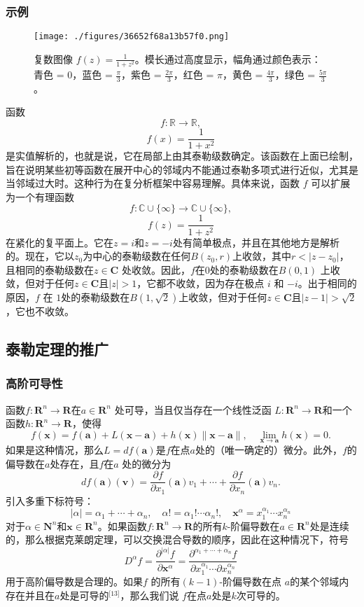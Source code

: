 \subsubsection{示例}
\begin{figure}[ht]
\centering
\texttt{[image: ./figures/36652f68a13b57f0.png]}
\caption{复数图像 \( f(z) = \frac{1}{1 + z^2} \)。模长通过高度显示，幅角通过颜色表示：青色 = 0，蓝色 = \( \frac{\pi}{3} \)，紫色 = \( \frac{2\pi}{3} \)，红色 = \( \pi \)，黄色 = \( \frac{4\pi}{3} \)，绿色 = \( \frac{5\pi}{3} \)。} \label{fig_TLGS_6}
\end{figure}
函数
\[
f : \mathbb{R} \to \mathbb{R},~
\]
\[
f(x) = \frac{1}{1 + x^2}~
\]
是实值解析的，也就是说，它在局部上由其泰勒级数确定。该函数在上面已绘制，旨在说明某些初等函数在展开中心的邻域内不能通过泰勒多项式进行近似，尤其是当邻域过大时。这种行为在复分析框架中容易理解。具体来说，函数 \( f \) 可以扩展为一个有理函数
\[
f : \mathbb{C} \cup \{\infty\} \to \mathbb{C} \cup \{\infty\},~
\]
\[
f(z) = \frac{1}{1 + z^2}~
\]
在紧化的复平面上。它在\( z = i \)和\( z = -i \)处有简单极点，并且在其他地方是解析的。现在，它以\( z_0 \)为中心的泰勒级数在任何\( B(z_0, r) \)上收敛，其中\( r < |z - z_0| \)，且相同的泰勒级数在\( z \in \mathbf{C} \) 处收敛。因此，\( f \)在\( 0 \)处的泰勒级数在\( B(0, 1) \) 上收敛，但对于任何\( z \in \mathbf{C} \)且\( |z| > 1 \)，它都不收敛，因为存在极点 \( i \) 和 \( -i \)。出于相同的原因，\( f \) 在 \( 1 \)处的泰勒级数在\( B(1, \sqrt{2}) \)上收敛，但对于任何\( z \in \mathbf{C} \)且\( |z - 1| > \sqrt{2} \)，它也不收敛。
\subsection{泰勒定理的推广}  
\subsubsection{高阶可导性}  
函数\( f : \mathbf{R}^n \to \mathbf{R} \)在\( a \in \mathbf{R}^n \) 处可导，当且仅当存在一个线性泛函 \( L : \mathbf{R}^n \to \mathbf{R} \)和一个函数\( h : \mathbf{R}^n \to \mathbf{R} \)，使得
\[
f(\mathbf{x}) = f(\mathbf{a}) + L(\mathbf{x} - \mathbf{a}) + h(\mathbf{x}) \|\mathbf{x} - \mathbf{a}\|, \quad \lim_{\mathbf{x} \to \mathbf{a}} h(\mathbf{x}) = 0.~
\]
如果是这种情况，那么\( L = df(\mathbf{a}) \)是\( f \)在点\( a \)处的（唯一确定的）微分。此外，\( f \)的偏导数在\( a \)处存在，且\( f \)在\( a \) 处的微分为
\[
df(\mathbf{a})(\mathbf{v}) = \frac{\partial f}{\partial x_1}(\mathbf{a}) v_1 + \cdots + \frac{\partial f}{\partial x_n}(\mathbf{a}) v_n.~
\]
引入多重下标符号：
\[
|\alpha| = \alpha_1 + \cdots + \alpha_n, \quad \alpha! = \alpha_1! \cdots \alpha_n!, \quad \mathbf{x}^{\alpha} = x_1^{\alpha_1} \cdots x_n^{\alpha_n}~
\]
对于\( \alpha \in \mathbf{N}^n \)和\( \mathbf{x} \in \mathbf{R}^n \)。如果函数\( f : \mathbf{R}^n \to \mathbf{R} \)的所有\( k \)-阶偏导数在\( a \in \mathbf{R}^n \)处是连续的，那么根据克莱朗定理，可以交换混合导数的顺序，因此在这种情况下，符号
\[
D^{\alpha} f = \frac{\partial^{|\alpha|} f}{\partial \mathbf{x}^{\alpha}} = \frac{\partial^{\alpha_1 + \cdots + \alpha_n} f}{\partial x_1^{\alpha_1} \cdots \partial x_n^{\alpha_n}}~
\]
用于高阶偏导数是合理的。如果\( f \) 的所有\( (k-1) \)-阶偏导数在点 \( a \)的某个邻域内存在并且在\( a \)处是可导的\(^\text{[13]}\)，那么我们说 \( f \)在点\( a \)处是\( k \)次可导的。
